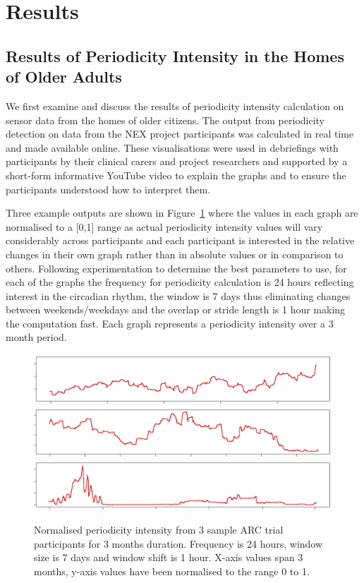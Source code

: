 \documentclass[preprints,article,accept,pdftex,moreauthors]{Definitions/mdpi}
\begin{document}
\section{Results}

\subsection{Results of Periodicity Intensity in the Homes of Older Adults}

{We first examine and discuss the results of periodicity intensity calculation on sensor data from the homes of older citizens.}
The output from periodicity detection on data from {the} NEX project participants was calculated in real time and made available online.  These visualisations were used in debriefings with participants by their clinical carers and project researchers and supported by a short-form informative YouTube video to explain the graphs and to ensure the{ participants} understood how to interpret them.  

Three example outputs are shown in Figure~\ref{fig:NEX-participant} where the values in each graph are normalised to a [0,1] range as actual periodicity intensity values will vary considerably across participants and each participant is interested in the relative changes in their own graph rather than in absolute values or {in} comparison to others.  Following experimentation to determine the best parameters to use, for each of the graphs the frequency for periodicity calculation is 24 hours reflecting interest in the circadian rhythm, the window is 7 days thus eliminating changes between weekends/weekdays and the overlap or stride length {} is 1 hour making the computation fast. Each graph represents a periodicity intensity over {a} 3 month{ period}.

\begin{figure}[H]
\centering
\includegraphics[width=\linewidth]{home-a.png}
\includegraphics[width=\linewidth]{home-b.png}
\includegraphics[width=\linewidth]{home-c.png}
\caption{{Normalised} periodicity intensity from 3 sample ARC trial participants for 3 months duration. Frequency is 24 hours, window size is 7 days and window shift is 1 hour. {X-axis values span 3 months, y-axis values have been normalised to the range 0 to 1.}\label{fig:NEX-participant}}
\end{figure}   
\end{document}

